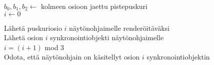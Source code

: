 \perusalgoritmi


$b_0, b_1, b_2 \gets$ kolmeen osioon jaettu pistepuskuri\\
$i \gets 0$ 

 {
     {
        Lähetä puskuriosio $i$ näytönohjaimelle renderöitäväksi\\
        Lähetä osion $i$ synkronointiobjekti näytönohjaimelle\\
        $i = (i + 1)$ mod $3$\\
        Odota, että näytönohjain on käsitellyt osion $i$ synkronointiobjektin
    }
}